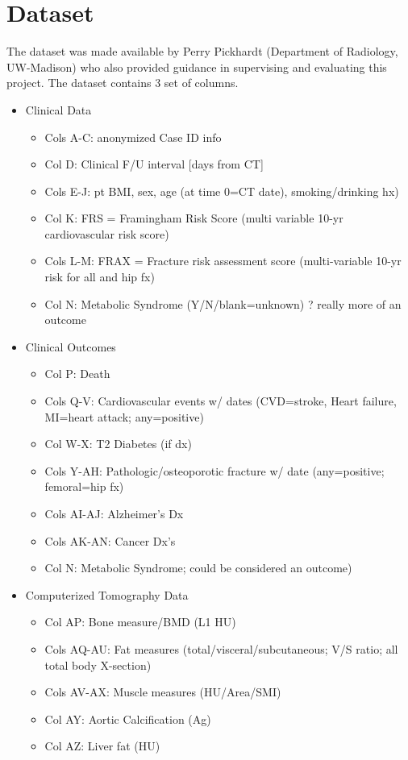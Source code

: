 \section{Dataset}
The dataset was made available by Perry Pickhardt (Department of Radiology, UW-Madison) who also provided guidance in supervising and evaluating this project. The dataset contains 3 set of columns.


\begin{itemize}
    \item Clinical Data
    \begin{itemize}
        \item Cols A-C: anonymized Case ID info
        \item Col D: Clinical F/U interval [days from CT]
        \item Cols E-J: pt BMI, sex, age (at time 0=CT date), smoking/drinking hx)
        \item Col K: FRS = Framingham Risk Score (multi variable 10-yr cardiovascular risk score)
        \item Cols L-M: FRAX = Fracture risk assessment score (multi-variable 10-yr risk for all and hip fx)
        \item Col N: Metabolic Syndrome (Y/N/blank=unknown) ? really more of an outcome
    \end{itemize}
    \item Clinical Outcomes
    \begin{itemize}
        \item Col P: Death
        \item Cols Q-V: Cardiovascular events w/ dates (CVD=stroke, Heart failure, MI=heart attack; any=positive)
        \item Col W-X: T2 Diabetes (if dx)
        \item Cols Y-AH: Pathologic/osteoporotic fracture w/ date (any=positive; femoral=hip fx)
        \item Cols AI-AJ: Alzheimer’s Dx
        \item Cols AK-AN: Cancer Dx’s
        \item Col N: Metabolic Syndrome; could be considered an outcome)
    \end{itemize}
    \item Computerized Tomography Data
    \begin{itemize}
        \item Col AP: Bone measure/BMD (L1 HU)
        \item Cols AQ-AU: Fat measures (total/visceral/subcutaneous; V/S ratio; all total body X-section)
        \item Cols AV-AX: Muscle measures (HU/Area/SMI)
        \item Col AY: Aortic Calcification (Ag)
        \item Col AZ: Liver fat (HU)

    \end{itemize}
\end{itemize}